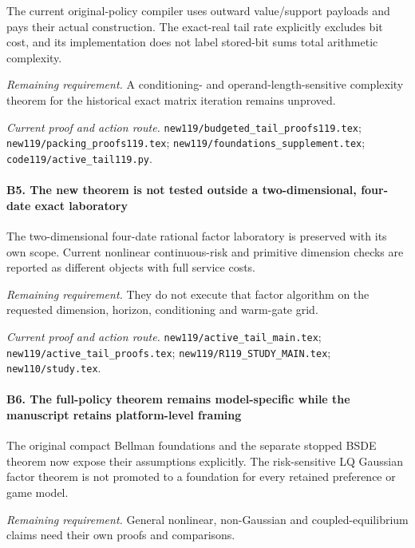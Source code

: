 The current original-policy compiler uses outward value/\allowbreak{}support payloads and pays their actual construction. The exact-real tail rate explicitly excludes bit cost, and its implementation does not label stored-bit sums total arithmetic complexity.

\par\emph{Remaining requirement.} A conditioning- and operand-length-sensitive complexity theorem for the historical exact matrix iteration remains unproved.

\par\emph{Current proof and action route.} \nolinkurl{new119/budgeted_tail_proofs119.tex}; \nolinkurl{new119/packing_proofs119.tex}; \nolinkurl{new119/foundations_supplement.tex}; \nolinkurl{code119/active_tail119.py}.

\paragraph{B5. The new theorem is not tested outside a two-dimensional, four-date exact laboratory}

The two-dimensional four-date rational factor laboratory is preserved with its own scope. Current nonlinear continuous-risk and primitive dimension checks are reported as different objects with full service costs.

\par\emph{Remaining requirement.} They do not execute that factor algorithm on the requested dimension, horizon, conditioning and warm-gate grid.

\par\emph{Current proof and action route.} \nolinkurl{new119/active_tail_main.tex}; \nolinkurl{new119/active_tail_proofs.tex}; \nolinkurl{new119/R119_STUDY_MAIN.tex}; \nolinkurl{new110/study.tex}.

\paragraph{B6. The full-policy theorem remains model-specific while the manuscript retains platform-level framing}

The original compact Bellman foundations and the separate stopped BSDE theorem now expose their assumptions explicitly. The risk-sensitive LQ Gaussian factor theorem is not promoted to a foundation for every retained preference or game model.

\par\emph{Remaining requirement.} General nonlinear, non-Gaussian and coupled-equilibrium claims need their own proofs and comparisons.

